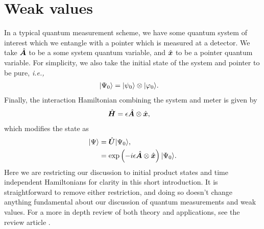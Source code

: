 \section{Weak values}
In a typical quantum measurement scheme, we have some quantum system of interest which we entangle with a pointer which is measured at a detector.  We take $\hat{\bm A}$ to be a some system quantum variable, and $\hat{\bm x}$ to be a pointer quantum variable.  For simplicity, we also take the initial state of the system and pointer to be pure, \emph{i.e.,}
\begin{align}
  \lvert \Psi_0\rangle &= \lvert \psi_0\rangle \otimes \lvert \varphi_0\rangle.
\end{align}
Finally, the interaction Hamiltonian combining the system and meter is given by
\begin{align}
  \hat{\bm H} &= \epsilon \hat{\bm A} \otimes \hat{\bm x},
\end{align}
which modifies the state as
\begin{align}
\nonumber  \lvert \Psi\rangle &= \hat{\bm U}\lvert \Psi_0\rangle, \\
                      &= \exp\left(-i\epsilon \hat{\bm A} \otimes \hat{\bm x} \right) \lvert \Psi_0\rangle.
\end{align}
Here we are restricting our discussion to initial product states and time independent Hamiltonians for clarity in this short introduction.  It is straightforward to remove either restriction, and doing so doesn't change anything fundamental about our discussion of quantum measurements and weak values.  For a more in depth review of both theory and applications, see the review article \cite{Dressel2014}.

